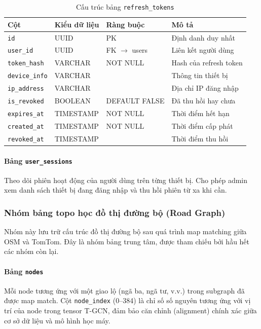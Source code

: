 \begin{table}[H]
\centering
\caption{Cấu trúc bảng \texttt{refresh\_tokens}}
\begin{tabular}{|l|l|l|p{5.5cm}|}
\hline
\textbf{Cột} & \textbf{Kiểu dữ liệu} & \textbf{Ràng buộc} & \textbf{Mô tả} \\
\hline
\texttt{id} & UUID & PK & Định danh duy nhất \\
\texttt{user\_id} & UUID & FK $\to$ users & Liên kết người dùng \\
\texttt{token\_hash} & VARCHAR & NOT NULL & Hash của refresh token \\
\texttt{device\_info} & VARCHAR & & Thông tin thiết bị \\
\texttt{ip\_address} & VARCHAR & & Địa chỉ IP đăng nhập \\
\texttt{is\_revoked} & BOOLEAN & DEFAULT FALSE & Đã thu hồi hay chưa \\
\texttt{expires\_at} & TIMESTAMP & NOT NULL & Thời điểm hết hạn \\
\texttt{created\_at} & TIMESTAMP & NOT NULL & Thời điểm cấp phát \\
\texttt{revoked\_at} & TIMESTAMP & & Thời điểm thu hồi \\
\hline
\end{tabular}
\end{table}

\paragraph{Bảng \texttt{user\_sessions}}
Theo dõi phiên hoạt động của người dùng trên từng thiết bị. Cho phép admin xem danh sách thiết bị đang đăng nhập và thu hồi phiên từ xa khi cần.

\subsubsection{Nhóm bảng topo học đồ thị đường bộ (Road Graph)}

Nhóm này lưu trữ cấu trúc đồ thị đường bộ sau quá trình map matching giữa OSM và TomTom. Đây là nhóm bảng trung tâm, được tham chiếu bởi hầu hết các nhóm còn lại.

\paragraph{Bảng \texttt{nodes}}
Mỗi node tương ứng với một giao lộ (ngã ba, ngã tư, v.v.) trong subgraph đã được map match. Cột \texttt{node\_index} (0--384) là chỉ số số nguyên tương ứng với vị trí của node trong tensor T-GCN, đảm bảo căn chỉnh (alignment) chính xác giữa cơ sở dữ liệu và mô hình học máy.

